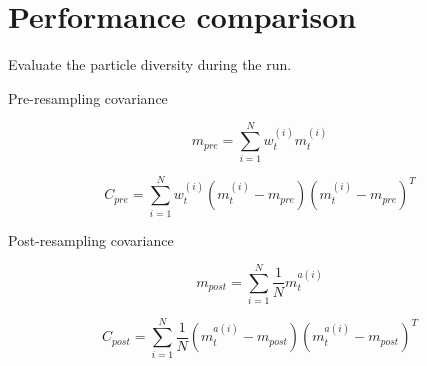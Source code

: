 



\section{Performance comparison}

Evaluate the particle diversity during the run.

Pre-resampling covariance

\begin{equation}
    m_{pre} = \sum_{i=1}^N w_t^{(i)} m_t^{(i)}
\end{equation}

\begin{equation}
    C_{pre} = \sum_{i=1}^N w_t^{(i)} \left( m_t^{(i)} - m_{pre} \right) \left( m_t^{(i)} - m_{pre} \right)^T
\end{equation}

Post-resampling covariance

\begin{equation}
    m_{post} = \sum_{i=1}^N \frac{1}{N} m_t^{a(i)}
\end{equation}

\begin{equation}
    C_{post} = \sum_{i=1}^N \frac{1}{N} \left( m_t^{a(i)} - m_{post} \right) \left( m_t^{a(i)} - m_{post} \right)^T
\end{equation}
